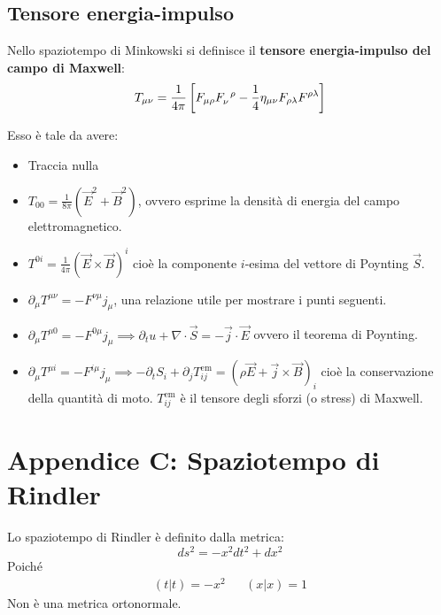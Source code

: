 \subsection{Tensore energia-impulso}
Nello spaziotempo di Minkowski si definisce il \textbf{tensore energia-impulso del campo di Maxwell}:
\begin{equation*}
    T_{\mu\nu} =\frac{1}{4\pi} \left[ F_{\mu\rho}\tensor{F}{_\nu^\rho} - \frac{1}{4}\eta_{\mu\nu} F_{\rho\lambda}F^{\rho\lambda}\right]
\end{equation*}

Esso è tale da avere:
\begin{itemize}
    \item Traccia nulla
    \item $T_{00}= \frac{1}{8\pi}(\Vec{E}^2 +\Vec{B}^2)$, ovvero esprime la densità di energia del campo elettromagnetico.
    \item $T^{0i} = \frac{1}{4\pi}(\Vec{E}\times\Vec{B})^i$ cioè la componente $i$-esima del vettore di Poynting $\Vec{S}$.
    \item $\partial_\mu T^{\mu\nu} = - F^{\nu\mu}j_{\mu}$, una relazione utile per mostrare i punti seguenti.
    \item $\partial_\mu T^{\mu 0} = - F^{0\mu}j_{\mu} \implies \partial_t u + \nabla \cdot \Vec{S} = - \Vec{j}\cdot \Vec{E}$ ovvero il teorema di Poynting.
    \item $\partial_\mu T^{\mu i} = - F^{i\mu}j_{\mu} \implies - \partial_t S_i + \partial_j T_{ij}^\textrm{em} = (\rho \Vec{E} + \Vec{j}\times \Vec{B})_i$ cioè la conservazione della quantità di moto. $T_{ij}^\textrm{em}$ è il tensore degli sforzi (o stress) di Maxwell.
\end{itemize}

\section{Appendice C: Spaziotempo di Rindler}
Lo spaziotempo di Rindler è definito dalla metrica:
\begin{equation}
    ds^2 = -x^2dt^2 + dx^2
    \label{eq.metrica_rindler}
\end{equation}
Poiché
\begin{align*}
    (t|t)= -x^2 && (x|x)=1
\end{align*}
Non è una metrica ortonormale.
